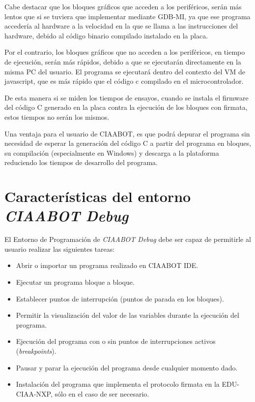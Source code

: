 Cabe destacar que los bloques gráficos que acceden a los periféricos,
serán más lentos que si se tuviera que implementar mediante GDB-MI, ya que ese programa accedería al hardware a la velocidad en la que
se llama a las instrucciones del hardware, debido al código binario compilado
instalado en la placa.

Por el contrario, los bloques gráficos que no acceden a los periféricos, en tiempo
de ejecución, serán más rápidos, debido a que se ejecutarán directamente en la
misma PC del usuario. El programa se ejecutará dentro del contexto del VM de
javascript, que es más rápido que el código c compilado en el microcontrolador.

De esta manera si se miden los tiempos de ensayos, cuando se instala el firmware
del código C generado en la placa contra la ejecución de los bloques con firmata, estos tiempos no serán los mismos.

Una ventaja para el usuario de CIAABOT, es que podrá depurar el programa sin necesidad de esperar la generación del código C a partir del programa en bloques, su compilación (especialmente en Windows) y descarga a la plataforma reduciendo los tiempos de desarrollo del programa.


\section{Características del entorno \emph{CIAABOT Debug}}
\label{sec:Características del entorno CIAABOT debug}

El Entorno de Programación de \emph{CIAABOT Debug} debe ser capaz de permitirle al usuario realizar las siguientes tareas:

\begin{itemize}
	\item Abrir o importar un programa realizado en CIAABOT IDE.
	\item Ejecutar un programa bloque a bloque.	
	\item Establecer puntos de interrupción  (puntos de parada en los bloques).
	\item Permitir la visualización del valor de las variables durante la ejecución del programa.
	\item Ejecución del programa con o sin puntos de interrupciones activos (\emph{breakpoints}).
	\item Pausar y parar la ejecución del programa desde cualquier momento dado.
	\item Instalación del programa que implementa el protocolo firmata en la EDU-CIAA-NXP, sólo en el caso de ser necesario.
\end{itemize}

